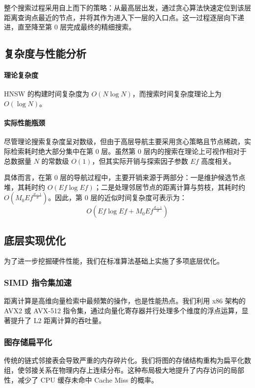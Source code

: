 \documentclass{article}
\begin{document}
整个搜索过程采用自上而下的策略：从最高层出发，通过贪心算法快速定位到该层距离查询点最近的节点，并将其作为进入下一层的入口点。这一过程逐层向下递进，直至降至第 0 层完成最终的精细搜索。

\subsection{复杂度与性能分析}

\paragraph{理论复杂度}
HNSW 的构建时间复杂度为 $O(N \log N)$，而搜索时间复杂度理论上为 $O(\log N)$。

\paragraph{实际性能瓶颈}
尽管理论搜索复杂度呈对数级，但由于高层导航主要采用贪心策略且节点稀疏，实际检索耗时绝大部分集中在第 0 层。虽然第 0 层内的搜索在理论上可视作相对于总数据量 $N$ 的常数级 $O(1)$，但其实际开销与探索因子参数 $Ef$ 高度相关。

具体而言，在第 0 层的导航过程中，主要开销来源于两部分：一是维护候选节点堆，其耗时约 $O(Ef \log Ef)$；二是处理邻居节点的距离计算与剪枝，其耗时约 $O(M_0 Ef^{\frac{d - 1}{d}})$。因此，第 0 层的近似时间复杂度可表示为：
\[ O(Ef \log Ef + M_0 Ef^{\frac{d - 1}{d}}) \]

\subsection{底层实现优化}

为了进一步挖掘硬件性能，我们在标准算法基础上实施了多项底层优化。

\subsubsection{SIMD 指令集加速}
距离计算是高维向量检索中最频繁的操作，也是性能热点。我们利用 x86 架构的 AVX2 或 AVX-512 指令集，通过向量化寄存器并行处理多个维度的浮点运算，显著提升了 L2 距离计算的吞吐量。

\subsubsection{图存储扁平化}
传统的链式邻接表会导致严重的内存碎片化。我们将图的存储结构重构为扁平化数组，使邻接关系在物理内存上连续分布。这种布局极大地提升了内存访问的局部性，减少了 CPU 缓存未命中 Cache Miss 的概率。
\end{document}
